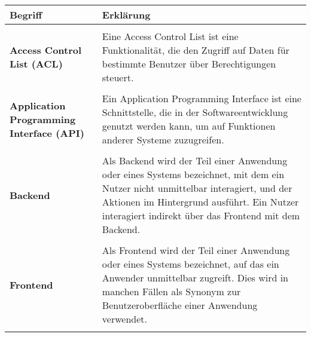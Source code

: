\chapter{\glossaryname}

\begin{longtable}{p{5cm}p{10cm}}
    \textbf{Begriff} & \textbf{Erklärung} \\
    \hline
    \\
    \textbf{Access Control List (ACL)} & Eine Access Control List ist eine Funktionalität, die den Zugriff auf Daten für bestimmte Benutzer über Berechtigungen steuert. \\\\
    \textbf{Application Programming Interface (API)} & Ein Application Programming Interface ist eine Schnittstelle, die in der Softwareentwicklung genutzt werden kann, um auf Funktionen anderer Systeme zuzugreifen. \\\\
    \textbf{Backend} & Als Backend wird der Teil einer Anwendung oder eines Systems bezeichnet, mit dem ein Nutzer nicht unmittelbar interagiert, und der Aktionen im Hintergrund ausführt. Ein Nutzer interagiert indirekt über das Frontend mit dem Backend. \\\\
    \textbf{Frontend} & Als Frontend wird der Teil einer Anwendung oder eines Systems bezeichnet, auf das ein Anwender unmittelbar zugreift. Dies wird in manchen Fällen als Synonym zur Benutzeroberfläche einer Anwendung verwendet. \\\\
\end{longtable}
